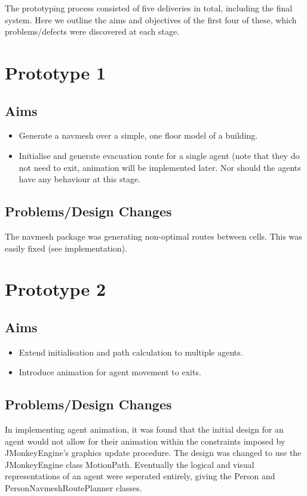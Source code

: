 %

\label{Proto:sec:main}
The prototyping process consisted of five deliveries in total, including the final system. Here we outline the aims and objectives of the first four of these, which problems/defects were discovered at each stage.

\section{Prototype 1}
\subsection{Aims}
\begin{itemize}
\item{Generate a navmesh over a simple, one floor model of a building.}
\item{Initialise and generate evacuation route for a single agent (note that they do not need to exit, animation will be implemented later. Nor should the agents have any behaviour at this stage.}
\end{itemize}
\subsection{Problems/Design Changes}
The navmesh package was generating non-optimal routes between cells. This was easily fixed (see implementation).

\section{Prototype 2}
\subsection{Aims}
\begin{itemize}
\item{Extend initialisation and path calculation to multiple agents.}
\item{Introduce animation for agent movement to exits.}
\end{itemize}
\subsection{Problems/Design Changes}
In implementing agent animation, it was found that the initial design for an agent would not allow for their animation within the constraints imposed by JMonkeyEngine's graphics update procedure. The design was changed to use the JMonkeyEngine class MotionPath. Eventually the logical and visual representations of an agent were seperated entirely, giving the Person and PersonNavmeshRoutePlanner classes.

